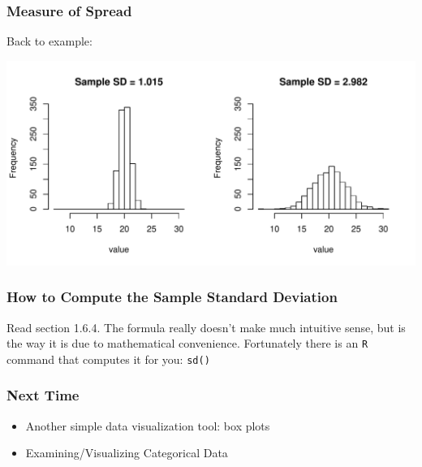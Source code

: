 \documentclass[handout]{beamer}
\newcommand{\blue}[1]{\textcolor{blue2}{#1}}
\begin{document}
\begin{frame}[fragile]
\frametitle{Measure of Spread}
Back to example:
\begin{center}
\includegraphics[width=\textwidth]{figure/spread2.pdf}
\end{center}

\end{frame}



\begin{frame}[fragile]
\frametitle{How to Compute the Sample Standard Deviation}

Read section 1.6.4.  The formula really doesn't make much intuitive sense, but is the way it is due to mathematical convenience.  Fortunately there is an {\tt R} command that computes it for you: {\tt sd()}

\end{frame}



\begin{frame}[fragile]
\frametitle{Next Time}

\begin{itemize}
\item Another simple data visualization tool: box plots
\item Examining/Visualizing \blue{Categorical} Data
\end{itemize}


\end{frame}
\end{document}
